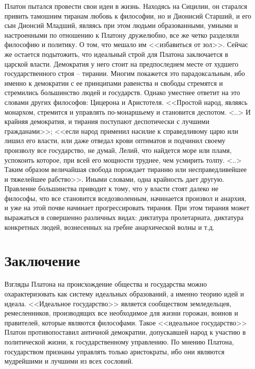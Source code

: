 	Платон пытался провести свои идеи в жизнь. Находясь на Сицилии, он 
	старался привить тамошним тиранам любовь к философии, но и Дионисий 
	Старший, и его сын Дионсий Младший, являясь при этом людьми 
	образованными, умными и настроенными по отношению к Платону 
	дружелюбно, все же четко разделяли философию и политику. О том, 
	что мешало им <<избавиться от зол>>. Сейчас же остается подытожить, 
	что идеальный строй для Платона заключается в царской власти. Демократия у 
	него стоит на предпоследнем месте от худшего государственного 
	строя -- тирании. Многим покажется это парадоксальным, ибо именно к 
	демократии с ее принципами равенства и свободы стремятся и стремились 
	большинство людей и государств. Однако уместнее ответит на это словами 
	других философов: Цицерона и Аристотеля. <<Простой народ, являясь монархом, 
	стремится и управлять по-монаршьему и становится деспотом. <..> 
	И крайняя демократия, и тирания поступают деспотически с лучшими 
	гражданами>>; <<если народ применил насилие к справедливому царю или 
	лишил его власти, или даже отведал крови оптиматов и подчинил своему 
	произволу все государство, не думай, Лелий, что найдется море или пламя, 
	успокоить которое, при всей его мощности труднее, чем усмирить толпу. <..> 
	Таким образом величайшая свобода порождает тиранию или несправедливейшее 
	и тяжелейшее рабство>>. Иными словами, одна крайность дает другую. 
	Правление большинства приводит к тому, что у власти стоят далеко не 
	философы, что все становится вседозволенным, начинается произвол и 
	анархия, и уже на этой почве начинает прогрессировать тирания. 
	При этом тирания может выражаться в совершенно различных видах: 
	диктатура пролетариата, диктатура конкретных людей, вознесенных на 
	гребне анархической волны и т.д.

\chapter{Заключение}
	Взгляды Платона на происхождение общества и государства можно 
	охарактеризовать как систему идеальных образований, а именно теорию 
	идей и идеала. <<Идеальное государство>> является сообществом земледельцев, 
	ремесленников, производящих все необходимое для жизни горожан, воинов и 
	правителей, которые являются философами. Такое <<идеальное государство>> 
	Платон противопоставил античной демократии, допускавшей народ к участию 
	в политической жизни, к государственному управлению. По мнению Платона, 
	государством признаны управлять только аристократы, ибо они являются 
	мудрейшими и лучшими из всех сословий.

